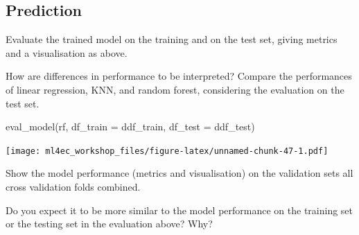 \documentclass[
]{book}
\newenvironment{Shaded}{\begin{snugshade}}{\end{snugshade}}
\newcommand{\AttributeTok}[1]{\textcolor[rgb]{0.77,0.63,0.00}{#1}}
\newcommand{\FunctionTok}[1]{\textcolor[rgb]{0.00,0.00,0.00}{#1}}
\newcommand{\NormalTok}[1]{#1}
\begin{document}
\hypertarget{prediction-5}{%
\subsection{Prediction}\label{prediction-5}}

Evaluate the trained model on the training and on the test set, giving metrics and a visualisation as above.

How are differences in performance to be interpreted? Compare the performances of linear regression, KNN, and random forest, considering the evaluation on the test set.

\begin{Shaded}
\begin{Highlighting}[]
\FunctionTok{eval\_model}\NormalTok{(rf, }\AttributeTok{df\_train =}\NormalTok{ ddf\_train, }\AttributeTok{df\_test =}\NormalTok{ ddf\_test)}
\end{Highlighting}
\end{Shaded}

\texttt{[image: ml4ec\_workshop\_files/figure-latex/unnamed-chunk-47-1.pdf]}

Show the model performance (metrics and visualisation) on the validation sets all cross validation folds combined.

Do you expect it to be more similar to the model performance on the training set or the testing set in the evaluation above? Why?
\end{document}
